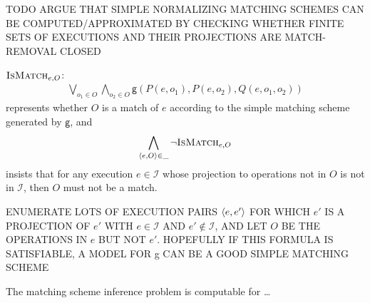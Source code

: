 TODO ARGUE THAT SIMPLE NORMALIZING MATCHING SCHEMES CAN BE
COMPUTED/APPROXIMATED BY CHECKING WHETHER FINITE SETS OF EXECUTIONS AND THEIR
PROJECTIONS ARE MATCH-REMOVAL CLOSED

$\textsc{IsMatch}_{e,O}$:
\begin{align*}
  \bigvee_{o_1 \in O} \bigwedge_{o_2 \in O}
  \mathsf{g}(P(e,o_1), P(e,o_2), Q(e,o_1,o_2))
\end{align*}
represents whether $O$ is a match of $e$ according to the simple matching
scheme generated by $\mathsf{g}$, and
\begin{align*}
  \bigwedge_{{\left\langle{e,O}\right\rangle}\in \_} \lnot \textsc{IsMatch}_{e,O}
\end{align*}
insists that for any execution $e \in \mathcal{I}$ whose projection to
operations not in $O$ is not in $\mathcal{I}$, then $O$ must not be a match.

ENUMERATE LOTS OF EXECUTION PAIRS ${\left\langle{e,e'}\right\rangle}$ FOR WHICH $e'$ IS A PROJECTION
OF $e'$ WITH $e \in \mathcal{I}$ AND $e' \not\in \mathcal{I}$, AND LET $O$ BE
THE OPERATIONS IN $e$ BUT NOT $e'$. HOPEFULLY IF THIS FORMULA IS SATISFIABLE, A
MODEL FOR {\sf g} CAN BE A GOOD SIMPLE MATCHING SCHEME

\begin{theorem}

  The matching scheme inference problem is computable for \ldots

\end{theorem}
